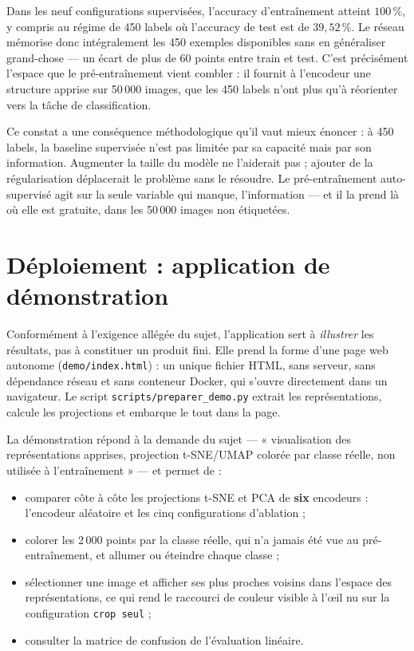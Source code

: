 \documentclass[11pt,a4paper]{article}
\begin{document}
Dans les neuf configurations supervisées, l'accuracy d'entraînement atteint $100\,\%$, y
compris au régime de 450 labels où l'accuracy de test est de $39{,}52\,\%$. Le réseau mémorise
donc intégralement les 450 exemples disponibles sans en généraliser grand-chose --- un écart
de plus de 60 points entre train et test. C'est précisément l'espace que le pré-entraînement
vient combler : il fournit à l'encodeur une structure apprise sur 50\,000 images, que les
450 labels n'ont plus qu'à réorienter vers la tâche de classification.

Ce constat a une conséquence méthodologique qu'il vaut mieux énoncer : à 450 labels, la
baseline supervisée n'est pas limitée par sa capacité mais par son information. Augmenter la
taille du modèle ne l'aiderait pas ; ajouter de la régularisation déplacerait le problème
sans le résoudre. Le pré-entraînement auto-supervisé agit sur la seule variable qui manque,
l'information --- et il la prend là où elle est gratuite, dans les 50\,000 images non
étiquetées.

\section{Déploiement : application de démonstration}
\label{sec:deploiement}

Conformément à l'exigence allégée du sujet, l'application sert à \emph{illustrer} les
résultats, pas à constituer un produit fini. Elle prend la forme d'une page web autonome
(\texttt{demo/index.html}) : un unique fichier HTML, sans serveur, sans dépendance réseau et
sans conteneur Docker, qui s'ouvre directement dans un navigateur. Le script
\texttt{scripts/preparer\_demo.py} extrait les représentations, calcule les projections et
embarque le tout dans la page.

La démonstration répond à la demande du sujet --- « visualisation des représentations
apprises, projection t-SNE/UMAP colorée par classe réelle, non utilisée à l'entraînement » ---
et permet de :

\begin{itemize}
\item comparer côte à côte les projections t-SNE et PCA de \textbf{six} encodeurs :
l'encodeur aléatoire et les cinq configurations d'ablation ;
\item colorer les 2\,000 points par la classe réelle, qui n'a jamais été vue au
pré-entraînement, et allumer ou éteindre chaque classe ;
\item sélectionner une image et afficher ses plus proches voisins dans l'espace des
représentations, ce qui rend le raccourci de couleur visible à l'\oe il nu sur la
configuration \texttt{crop seul} ;
\item consulter la matrice de confusion de l'évaluation linéaire.
\end{itemize}
\end{document}
